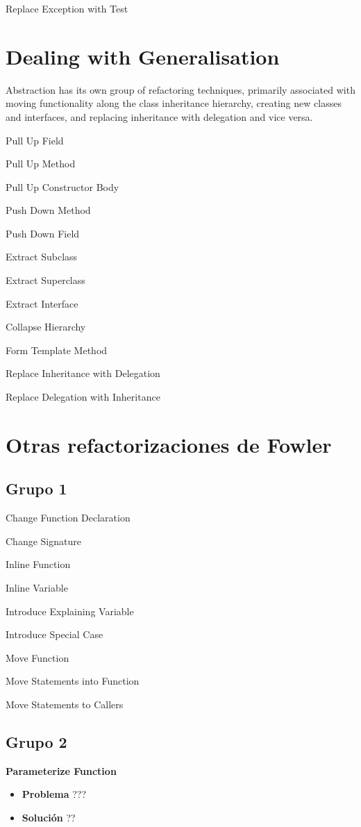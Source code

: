 \documentclass[11pt,a4paper,oneside]{book}
\begin{document}
    Replace Exception with Test




\section{Dealing with Generalisation}

Abstraction has its own group of refactoring techniques, primarily associated with moving functionality along the class inheritance hierarchy, creating new classes and interfaces, and replacing inheritance with delegation and vice versa.

    Pull Up Field
    
    Pull Up Method
    
    Pull Up Constructor Body
    
    Push Down Method
    
    Push Down Field
    
    Extract Subclass
    
    Extract Superclass
    
    Extract Interface
    
    Collapse Hierarchy
    
    Form Template Method
    
    Replace Inheritance with Delegation
    
    Replace Delegation with Inheritance


\section{Otras refactorizaciones de Fowler}
\subsection{Grupo 1}
Change Function Declaration

Change Signature 

Inline Function

Inline Variable

Introduce Explaining Variable

Introduce Special Case

Move Function

Move Statements into Function

Move Statements to Callers


\subsection{Grupo 2}
\textbf{Parameterize Function}
\label{ParameterizeFunction}
\begin{itemize}
    \item \textbf{Problema} ???
    
    
    \item \textbf{Solución} ??
      
    
\end{itemize}
\end{document}
